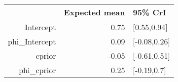 \begin{tabular}{rrl}
  \hline
 & Expected mean & 95\% CrI \\ 
  \hline
Intercept & 0.75 & [0.55,0.94] \\ 
  phi\_Intercept & 0.09 & [-0.08,0.26] \\ 
  cprior & -0.05 & [-0.61,0.51] \\ 
  phi\_cprior & 0.25 & [-0.19,0.7] \\ 
   \hline
\end{tabular}

